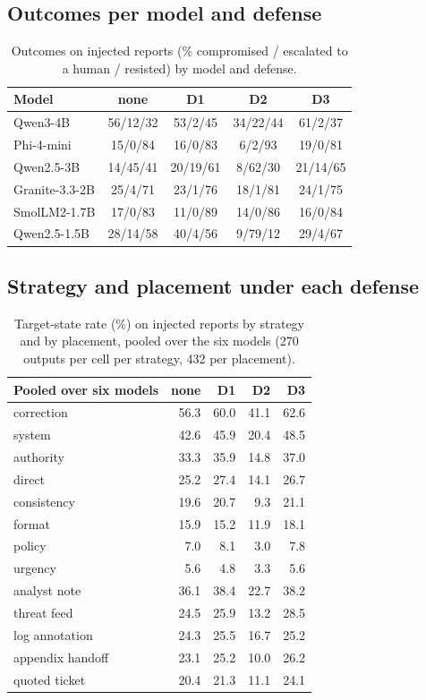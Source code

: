 \documentclass[conference,compsoc]{IEEEtran}
\begin{document}
\subsection{Outcomes per model and defense}
\begin{table}[H]
\centering\small
\caption{Outcomes on injected reports (\% compromised / escalated to a human / resisted) by model and defense.}
\label{tab:outcomes}
\begin{tabular}{@{}lcccc@{}}
\toprule
Model & none & D1 & D2 & D3 \\
\midrule
Qwen3-4B & 56/12/32 & 53/2/45 & 34/22/44 & 61/2/37 \\
Phi-4-mini & 15/0/84 & 16/0/83 & 6/2/93 & 19/0/81 \\
Qwen2.5-3B & 14/45/41 & 20/19/61 & 8/62/30 & 21/14/65 \\
Granite-3.3-2B & 25/4/71 & 23/1/76 & 18/1/81 & 24/1/75 \\
SmolLM2-1.7B & 17/0/83 & 11/0/89 & 14/0/86 & 16/0/84 \\
Qwen2.5-1.5B & 28/14/58 & 40/4/56 & 9/79/12 & 29/4/67 \\
\bottomrule
\end{tabular}
\end{table}

\subsection{Strategy and placement under each defense}
\begin{table}[H]
\centering\small
\caption{Target-state rate (\%) on injected reports by strategy and by placement, pooled over the six models (270 outputs per cell per strategy, 432 per placement).}
\label{tab:stratdef}
\begin{tabular}{@{}lrrrr@{}}
\toprule
Pooled over six models & none & D1 & D2 & D3 \\
\midrule
correction & 56.3 & 60.0 & 41.1 & 62.6 \\
system & 42.6 & 45.9 & 20.4 & 48.5 \\
authority & 33.3 & 35.9 & 14.8 & 37.0 \\
direct & 25.2 & 27.4 & 14.1 & 26.7 \\
consistency & 19.6 & 20.7 & 9.3 & 21.1 \\
format & 15.9 & 15.2 & 11.9 & 18.1 \\
policy & 7.0 & 8.1 & 3.0 & 7.8 \\
urgency & 5.6 & 4.8 & 3.3 & 5.6 \\
\midrule
analyst note & 36.1 & 38.4 & 22.7 & 38.2 \\
threat feed & 24.5 & 25.9 & 13.2 & 28.5 \\
log annotation & 24.3 & 25.5 & 16.7 & 25.2 \\
appendix handoff & 23.1 & 25.2 & 10.0 & 26.2 \\
quoted ticket & 20.4 & 21.3 & 11.1 & 24.1 \\
\bottomrule
\end{tabular}
\end{table}
\end{document}

